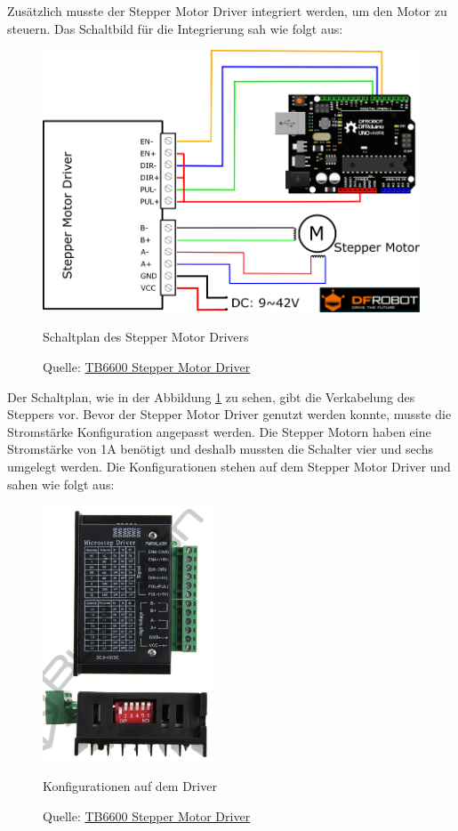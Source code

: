 Zusätzlich musste der Stepper Motor Driver integriert werden, um den Motor zu steuern. Das Schaltbild für die Integrierung sah wie folgt aus:

\begin{figure}[H]
 \centerline{\includegraphics[width=\textwidth,scale=1]{./images/circuit_plan_stepper_motor_driver.png}}
 \caption{Schaltplan des Stepper Motor Drivers}\label{schaltplan_stepper}
 \caption*{Quelle: \href{https://wiki.dfrobot.com/TB6600_Stepper_Motor_Driver_SKU__DRI0043}{TB6600 Stepper Motor Driver}}
\end{figure} 

Der Schaltplan, wie in der Abbildung \ref{schaltplan_stepper} zu sehen, gibt die Verkabelung des Steppers vor. Bevor der Stepper Motor Driver genutzt werden konnte, musste die Stromstärke Konfiguration angepasst werden. Die Stepper Motorn haben eine Stromstärke von 1A benötigt und deshalb mussten die Schalter vier und sechs umgelegt werden. Die Konfigurationen stehen auf dem Stepper Motor Driver und sahen wie folgt aus:

\begin{figure}[H]
 \centerline{\includegraphics[width=0.45\textwidth,scale=1]{./images/stepper_motor_driver.png}}
 \caption{Konfigurationen auf dem Driver}\label{stepper}
 \caption*{Quelle: \href{https://bulkman3d.com/wp-content/uploads/2019/06/TB6600-Stepper-Motor-Driver-BM3D-v1.1.pdf}{TB6600 Stepper Motor Driver}}
\end{figure} 


